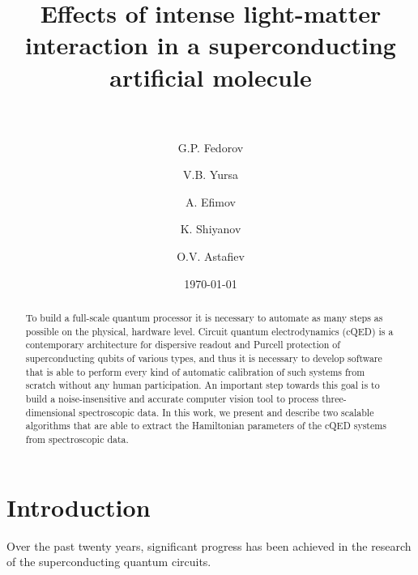 \documentclass[%
 aip,
 amsmath,amssymb,
 reprint,%
]{revtex4-1}
\newcommand{\mytitile}{Effects of intense light-matter interaction in a superconducting artificial molecule}
\begin{document}
	
	\title[\mytitile]{\mytitile\\~}
	
	\author{G.P. Fedorov}
	
	
	\author{V.B. Yursa}
	
	\author{A. Efimov}
	
	
	\author{K. Shiyanov}


	\author{O.V. Astafiev}
	
	
	\date{\today}%
	
	
	\begin{abstract}
		To build a full-scale quantum processor it is necessary to automate as many steps as possible on the physical, hardware level. Circuit quantum electrodynamics (cQED) is a contemporary architecture for dispersive readout and Purcell protection of superconducting qubits of various types, and thus it is necessary to develop software that is able to perform every kind of automatic calibration of such systems from scratch without any human participation. An important step towards this goal is to build a noise-insensitive and accurate computer vision tool to process three-dimensional spectroscopic data. In this work, we present and describe two scalable algorithms that are able to extract the Hamiltonian parameters of the cQED systems from spectroscopic data. 
	\end{abstract}
	
	\maketitle
\section{Introduction}
Over the past twenty years, significant progress has been achieved in the research of the superconducting quantum circuits. 
\end{document}
